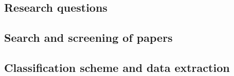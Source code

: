 




\subsection{Research questions}

\subsection{Search and screening of papers}

\subsection{Classification scheme and data extraction}